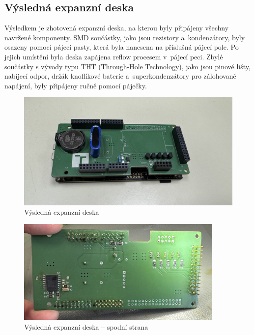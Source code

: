 \subsection{Výsledná expanzní deska}
\label{vysledek}
Výsledkem je zhotovená expanzní deska, na kterou byly připájeny všechny navržené komponenty. SMD součástky, jako jsou rezistory a~kondenzátory, byly osazeny pomocí pájecí pasty, která byla nanesena na příslušná pájecí pole. Po jejich umístění byla deska zapájena reflow procesem v~pájecí peci. Zbylé součástky s vývody typu THT (Through-Hole Technology), jako jsou pinové lišty, nabíjecí odpor, držák knoflíkové baterie a~superkondenzátory pro zálohované napájení, byly připájeny ručně pomocí páječky.

\begin{figure}[h]
    \centering
    \includegraphics[width=1.00\textwidth]{obrazky-figures/datalogger.jpg}
    
    \caption{Výsledná expanzní deska}
    \label{fig:expansion-board}
\end{figure}

\begin{figure}[h]
    \centering
    \includegraphics[width=0.90\textwidth]{obrazky-figures/expansion-shield-back.jpg}
    
    \caption{Výsledná expanzní deska -- spodní strana}
    \label{fig:expansion-board-back}
\end{figure}

